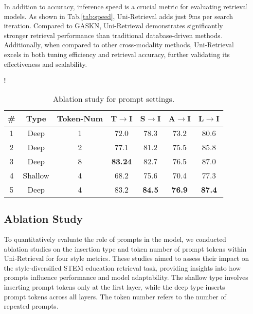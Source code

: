 In addition to accuracy, inference speed is a crucial metric for evaluating retrieval models. As shown in Tab.\ref{tab:speed}, Uni-Retrieval adds just 9ms per search iteration. 
Compared to GASKN, Uni-Retrieval demonstrates significantly stronger retrieval performance than traditional database-driven methods. 
Additionally, when compared to other cross-modality methods, Uni-Retrieval excels in both tuning efficiency and retrieval accuracy, further validating its effectiveness and scalability.

\begin{table}[h]
    \centering
    
    \resizebox{1.0\columnwidth}!{
    \begin{tabular}{c|c|c|cccc}
        \toprule[1.5pt]
        \textbf{\#} & \textbf{Type} & \textbf{Token-Num} & \textbf{T\textbf{$\rightarrow$}I} & \textbf{S\textbf{$\rightarrow$}I} & \textbf{A\textbf{$\rightarrow$}I} & \textbf{L\textbf{$\rightarrow$}I} \\ 
        \hline
        1 & Deep & 1 & 72.0 & 78.3 & 73.2 & 80.6\\
        2 & Deep & 2 & 77.1 & 81.2 & 75.5 & 85.8\\
        3 & Deep & 8 & \textbf{83.24} & 82.7 & 76.5 & 87.0\\
        4 & Shallow & 4 & 68.2 & 75.6 & 70.4 & 77.3\\
        \hline
        \rowcolor{aliceblue!60} 
        5 & Deep & 4 & 83.2 & \textbf{84.5} & \textbf{76.9} & \textbf{87.4}\\
        \bottomrule[1.5pt]
    \end{tabular}
    }
    \vspace{-2mm}
    \caption{Ablation study for prompt settings.}
    \label{ablation:prompt}
    \vspace{-5mm}
\end{table}


\subsection{Ablation Study}

To quantitatively evaluate the role of prompts in the model, we conducted ablation studies on the insertion type and token number of prompt tokens within Uni-Retrieval for four style metrics. These studies aimed to assess their impact on the style-diversified STEM education retrieval task, providing insights into how prompts influence performance and model adaptability. The shallow type involves inserting prompt tokens only at the first layer, while the deep type inserts prompt tokens across all layers. The token number refers to the number of repeated prompts. %

